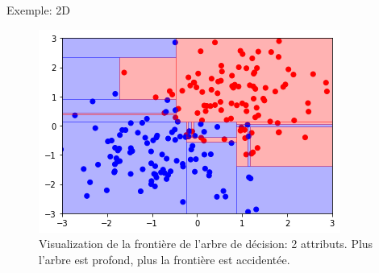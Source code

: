 \documentclass[8pt]{beamer}
\begin{document}
			\begin{frame}{Exemple: 2D}
				\begin{figure}[H]
					\includegraphics[width=.7\textwidth]{images/samples/boundary_decision_tree.png}
					\caption*{Visualization de la frontière de l'arbre de décision: 2 attributs. Plus l'arbre est profond, plus la frontière est accidentée.}
				\end{figure}
			\end{frame}
\end{document}
